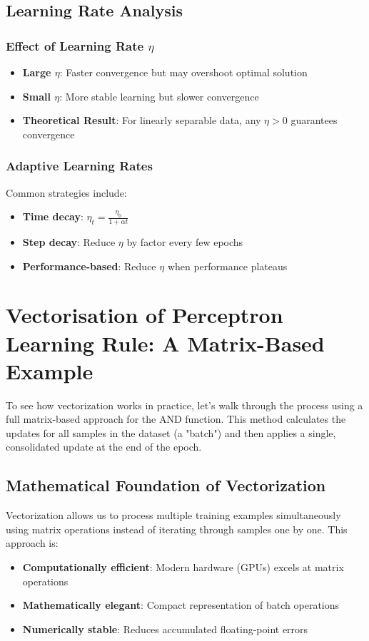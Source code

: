 \subsection{Learning Rate Analysis}
\subsubsection{Effect of Learning Rate \(\eta\)}
\begin{itemize}
    \item \textbf{Large \(\eta\)}: Faster convergence but may overshoot optimal solution
    \item \textbf{Small \(\eta\)}: More stable learning but slower convergence
    \item \textbf{Theoretical Result}: For linearly separable data, any \(\eta > 0\) guarantees convergence
\end{itemize}

\subsubsection{Adaptive Learning Rates}
Common strategies include:
\begin{itemize}
    \item \textbf{Time decay}: \(\eta_t = \frac{\eta_0}{1 + \alpha t}\)
    \item \textbf{Step decay}: Reduce \(\eta\) by factor every few epochs
    \item \textbf{Performance-based}: Reduce \(\eta\) when performance plateaus
\end{itemize}

\section{Vectorisation of Perceptron Learning Rule: A Matrix-Based Example}
To see how vectorization works in practice, let's walk through the process using a full matrix-based approach for the AND function. This method calculates the updates for all samples in the dataset (a "batch") and then applies a single, consolidated update at the end of the epoch.

\subsection{Mathematical Foundation of Vectorization}
Vectorization allows us to process multiple training examples simultaneously using matrix operations instead of iterating through samples one by one. This approach is:
\begin{itemize}
    \item \textbf{Computationally efficient}: Modern hardware (GPUs) excels at matrix operations
    \item \textbf{Mathematically elegant}: Compact representation of batch operations
    \item \textbf{Numerically stable}: Reduces accumulated floating-point errors
\end{itemize}

